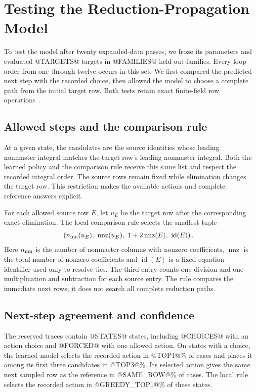\section{Testing the Reduction-Propagation Model}
\label{sec:reduction-test}
To test the model after twenty expanded-data passes, we froze its
parameters and evaluated @TARGETS@ targets in @FAMILIES@ held-out
families. Every loop order from one through twelve occurs in this
set. We first compared the predicted next step with the recorded
choice, then allowed the model to choose a complete path from the
initial target row. Both tests retain exact finite-field row
operations~\cite{ReductionModelTestData}.

\subsection{Allowed steps and the comparison rule}
At a given state, the candidates are the source identities whose
leading nonmaster integral matches the target row's leading
nonmaster integral. Both the learned policy and the comparison rule
receive this same list and respect the recorded integral order.
The source rows remain fixed while elimination changes the target
row. This restriction makes the available actions and complete
reference answers explicit.

For each allowed source row $E$, let $u_E$ be the target row after
the corresponding exact elimination. The local comparison rule
selects the smallest tuple
\begin{equation}
 \left(n_{\rm nm}(u_E),\
       \operatorname{nnz}(u_E),\
       1+2\operatorname{nnz}(E),\
       \operatorname{id}(E)\right).
 \label{eq:reduction-local-rule}
\end{equation}
Here $n_{\rm nm}$ is the number of nonmaster columns with nonzero
coefficients, $\operatorname{nnz}$ is the total number of nonzero
coefficients and $\operatorname{id}(E)$ is a fixed equation
identifier used only to resolve ties. The third entry counts one
division and one multiplication and subtraction for each source
entry. The rule compares the immediate next rows; it does not search
all complete reduction paths.

\subsection{Next-step agreement and confidence}
The reserved traces contain @STATES@ states, including
@CHOICES@ with an action choice and @FORCED@ with one allowed
action. On states with a choice, the learned model selects the
recorded action in @TOP1@\% of cases and places it among its first
three candidates in @TOP3@\%. Its selected action gives the same
next sampled row as the reference in @SAME_ROW@\% of cases.
The local rule selects the recorded action in @GREEDY_TOP1@\%
of these states.

